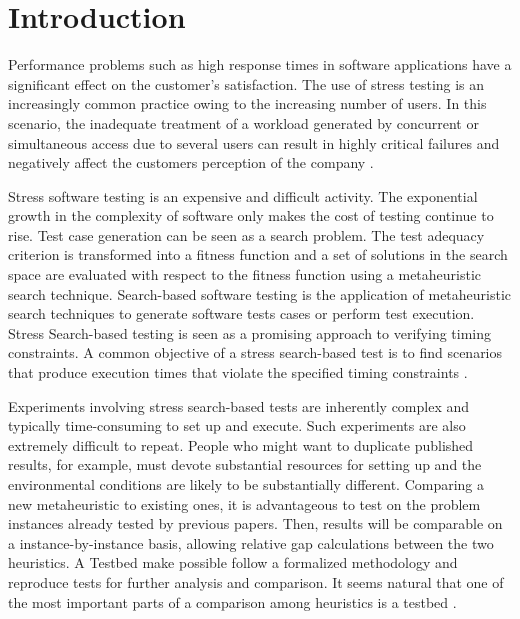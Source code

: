 

\section{Introduction}
\vspace*{-.05in}

Performance problems such as high response times in software applications have a significant effect on the customer’s satisfaction. The use of stress testing is an increasingly common practice owing to the increasing number of users. In this scenario, the inadequate treatment of a workload generated by concurrent or simultaneous access due to several users can result in highly critical failures and negatively affect the customers perception of the company \cite{Draheim2006b} \cite{Jiang2010} \cite{Molyneaux2009} \cite{Wert2014}. 

Stress software testing is an expensive and difficult activity. The exponential
growth in the complexity of software only makes the cost of testing  continue to rise. Test case generation can be seen as a search problem. The test adequacy criterion is transformed into a fitness function and a set of solutions in the search
space are evaluated with respect to the fitness function using a metaheuristic search technique. Search-based software testing is the application of metaheuristic search techniques to generate software
tests cases or perform test execution. Stress Search-based testing is seen as a promising approach to verifying timing constraints. A common objective of a stress search-based test is to find  scenarios that produce execution times that violate the specified timing constraints \cite{Afzal2009a}. 

Experiments involving stress search-based tests are inherently complex and typically time-consuming to set up and
execute. Such experiments are also extremely difficult to
repeat. People who might want to duplicate published results, for example, must devote substantial resources for setting up and the environmental conditions are likely to be substantially different. Comparing a new metaheuristic to existing ones, it is advantageous to test on the problem instances already tested by previous papers. Then, results will be comparable on a instance-by-instance basis, allowing relative gap calculations between the two heuristics. A Testbed make possible follow a formalized methodology and reproduce tests for further analysis and comparison. It seems natural that one of the most important parts of a comparison among heuristics is a testbed \cite{GendreauMichelandPotvin2010}.

